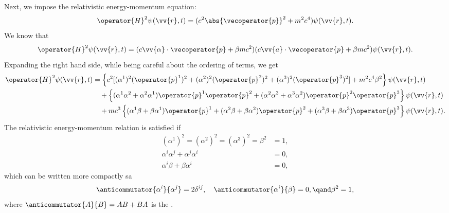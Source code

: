 Next, we impose the relativistic energy-momentum equation:
\begin{equation}
    \operator{H}^2\psi(\vv{r}, t) = (c^2\abs{\vecoperator{p}}^2 + m^2c^4)\psi(\vv{r}, t).
\end{equation}
We know that
\begin{equation}
    \operator{H}^2\psi(\vv{r}, t) = (c\vv{\alpha} \cdot \vecoperator{p} + \beta mc^2)(c\vv{a} \cdot \vecoperator{p} + \beta mc^2)\psi(\vv{r}, t).
\end{equation}
Expanding the right hand side, while being careful about the ordering of terms, we get
\begin{align}
    \operator{H}^2\psi(\vv{r}, t) &= \left\{ c^2[(\alpha^1)^2(\operator{p}^1)^2 + (\alpha^2)^2(\operator{p}^2)^2 + (\alpha^3)^2(\operator{p}^3)^2] + m^2c^4\beta^2 \right\} \psi(\vv{r}, t)\\
    & \quad + \left\{ (\alpha^1\alpha^2 + \alpha^2\alpha^1)\operator{p}^1\operator{p}^2 + (\alpha^2\alpha^3 + \alpha^3\alpha^2)\operator{p}^2\operator{p}^3 \right\}\psi(\vv{r}, t)\\
    & \quad + mc^3\left\{ (\alpha^1\beta + \beta\alpha^1)\operator{p}^1 + (\alpha^2\beta + \beta\alpha^2)\operator{p}^2 + (\alpha^3\beta + \beta\alpha^3)\operator{p}^3 \right\}\psi(\vv{r}, t).
\end{align}
The relativistic energy-momentum relation is satisfied if
\begin{align}
    (\alpha^1)^2 = (\alpha^2)^2 = (\alpha^3)^2 = \beta^2 &= 1,\\
    \alpha^i\alpha^j + \alpha^j\alpha^i &= 0,\\
    \alpha^i\beta + \beta\alpha^i &= 0,
\end{align}
which can be written more compactly sa
\begin{equation}
    \anticommutator{\alpha^i}{\alpha^j} = 2\delta^{ij}, \quad \anticommutator{\alpha^i}{\beta} = 0, \qand \beta^2 = 1,
\end{equation}
where \(\anticommutator{A}{B} = AB + BA\) is the .

